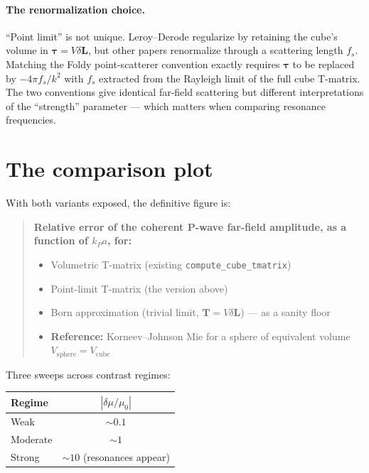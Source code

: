 \documentclass[11pt,a4paper]{article}
\newcommand{\T}{\bm{T}}
\newcommand{\dL}{\delta\bm{L}}
\begin{document}
\paragraph{The renormalization choice.}
``Point limit'' is not unique. Leroy--Derode regularize by retaining
the cube's volume in $\bm{\tau} = V\dL$, but other papers
renormalize through a scattering length $f_s$. Matching the Foldy
point-scatterer convention exactly requires $\bm{\tau}$ to be
replaced by $-4\pi f_s / k^2$ with $f_s$ extracted from the Rayleigh
limit of the full cube T-matrix. The two conventions give identical
far-field scattering but different interpretations of the
``strength'' parameter --- which matters when comparing resonance
frequencies.

\section{The comparison plot}

With both variants exposed, the definitive figure is:
\begin{quote}
\textbf{Relative error of the coherent P-wave far-field amplitude, as
a function of $k_P a$, for:}
\begin{itemize}[leftmargin=1.5em,nosep]
  \item Volumetric T-matrix (existing \texttt{compute\_cube\_tmatrix})
  \item Point-limit T-matrix (the version above)
  \item Born approximation (trivial limit, $\T = V\dL$)
        --- as a sanity floor
  \item \textbf{Reference:} Korneev--Johnson Mie for a sphere of
        equivalent volume $V_{\text{sphere}} = V_{\text{cube}}$
\end{itemize}
\end{quote}

Three sweeps across contrast regimes:
\begin{center}
\begin{tabular}{lc}
  \toprule
  Regime    & $|\delta\mu/\mu_0|$ \\
  \midrule
  Weak      & $\sim 0.1$ \\
  Moderate  & $\sim 1$   \\
  Strong    & $\sim 10$ (resonances appear) \\
  \bottomrule
\end{tabular}
\end{center}
\end{document}
